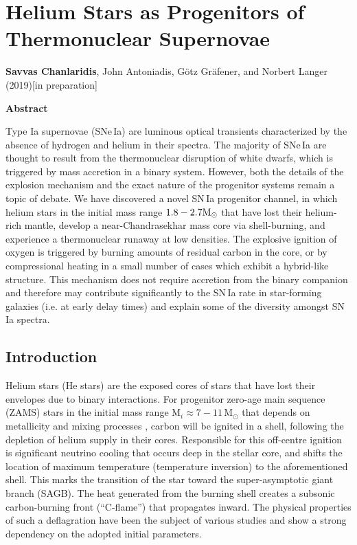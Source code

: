 \documentclass[../../main/thesis_msc.tex]{subfiles}
\begin{document}
\chapter{Helium Stars as Progenitors of Thermonuclear Supernovae}

\textbf{Savvas Chanlaridis}, John Antoniadis, G\"otz Gr\"afener, and Norbert Langer (2019)[in preparation]

\begin{center}
\textbf{\large Abstract}
\end{center}
		
Type Ia supernovae (SNe\,Ia) are luminous optical transients characterized by the absence of hydrogen and helium in their spectra. 
The majority of SNe\,Ia are thought to result from the thermonuclear disruption of white dwarfs, which is triggered by mass accretion in a binary system. 
However, both the details of the explosion mechanism and the exact nature of the progenitor systems remain a topic of debate. 
We have discovered a novel SN\,Ia progenitor channel, in which helium stars in the initial mass range $1.8-2.7 \rm M_{\odot}$ that have lost their helium-rich mantle, develop a near-Chandrasekhar mass core via shell-burning, and experience a thermonuclear runaway at low densities. The explosive ignition of oxygen is triggered by burning amounts of residual carbon in the core, or by compressional heating in a small number of cases which exhibit a hybrid-like structure. This mechanism does not require accretion from the binary companion and therefore may contribute significantly to the SN\,Ia rate in star-forming galaxies (i.e. at early delay times) and explain some of the diversity amongst SN\,Ia spectra.

\section{Introduction} \label{sec:introduction}
Helium stars (He stars) are the exposed cores of stars that have lost their envelopes due to binary interactions. For progenitor zero-age main sequence (ZAMS) stars in the initial mass range M$_i \approx  7 - 11$\,M$_{\odot}$ that depends on metallicity and mixing processes 
\citep[e.g.][]{Ritossa1996, Ritossa1999, GilPons2005, siess2006, Poelarends2008, Farmer:2015afs}, carbon will be ignited in a shell, following the depletion of helium supply in their cores. Responsible for this off-centre ignition is significant neutrino cooling that occurs deep in the stellar core, and shifts the location of maximum temperature (temperature inversion) to the aforementioned shell. This marks the transition of the star toward the super-asymptotic giant branch (SAGB). The heat generated from the burning shell creates a subsonic carbon-burning front (``C-flame'') that propagates inward. The physical properties of such a deflagration have been the subject of various studies \citep[e.g.][]{Timmes_1994, siess2006, Siess2009, Denissenkov:2013qaa, Farmer:2015afs} and show a strong dependency on the adopted initial parameters.
\end{document}
